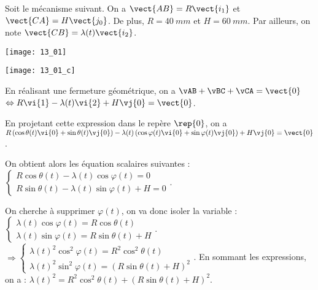 \normaltrue \difficilefalse \tdifficilefalse
\correctiontrue


\setcounter{question}{0}%

\ifcorrection
\else
{}
\fi

\ifprof
\else

Soit le mécanisme suivant. On a $\vect{AB}=R\vect{i_1}$ et $\vect{CA}=H\vect{j_0}$. De plus, 
$R=\SI{40}{mm}$ et $H=\SI{60}{mm}$. Par ailleurs, on note $\vect{CB}=\lambda(t) \vect{i_2}$.


\begin{marginfigure}
\texttt{[image: 13\_01]}
\end{marginfigure}
\fi



\ifprof

\begin{marginfigure}
\texttt{[image: 13\_01\_c]}
\end{marginfigure}

\else
\fi


\ifprof

En réalisant une fermeture géométrique, on a $\vAB + \vBC + \vCA = \vect{0}$ 
$\Leftrightarrow R\vi{1} - \lambda(t)\vi{2} + H \vj{0}= \vect{0}$. 

En projetant cette expression dans le repère 
$\rep{0}$, on a 
$ R\left(\cos\theta(t) \vi{0}+\sin\theta(t) \vj{0} \right) - \lambda(t)\left(\cos\varphi(t) \vi{0}+\sin\varphi(t) \vj{0} \right) + H \vj{0} = \vect{0}$.

On obtient alors les équation scalaires suivantes : 
$\left\{
\begin{array}{l}
R\cos\theta(t) - \lambda(t)\cos\varphi(t)  = {0} \\
R\sin\theta(t)  - \lambda(t)\sin\varphi(t) + H  = {0} 
\end{array}
\right.
$.

On cherche à supprimer $\varphi(t)$, on va donc isoler la variable :
$\left\{
\begin{array}{l}
\lambda(t)\cos\varphi(t) = R\cos\theta(t)   \\
\lambda(t)\sin\varphi(t)  = R\sin\theta(t)  +H  
\end{array}
\right.
$.
$
\Rightarrow
\left\{
\begin{array}{l}
\lambda(t)^2\cos^2\varphi(t) = R^2\cos^2\theta(t)   \\
\lambda(t)^2\sin^2\varphi(t)  = \left(R\sin\theta(t)  +H \right)^2
\end{array}
\right.
$.
En sommant les expressions, on a : 
$\lambda(t)^2 =  R^2\cos^2\theta(t)  + \left(R\sin\theta(t)  +H \right)^2$.

